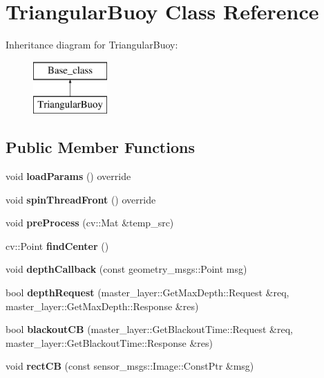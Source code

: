 \hypertarget{classTriangularBuoy}{}\section{Triangular\+Buoy Class Reference}
\label{classTriangularBuoy}
Inheritance diagram for Triangular\+Buoy\+:\begin{figure}[H]
\begin{center}
\leavevmode
\includegraphics[height=2.000000cm]{classTriangularBuoy}
\end{center}
\end{figure}
\subsection*{Public Member Functions}
\begin{DoxyCompactItemize}
\item 
\mbox{\label{classTriangularBuoy_a828edf15be63e5aa4268963eb9f80c2e}} 
void {\bfseries load\+Params} () override
\item 
\mbox{\label{classTriangularBuoy_a68fcbd32c061db9674e7dd8e3e21052c}} 
void {\bfseries spin\+Thread\+Front} () override
\item 
\mbox{\label{classTriangularBuoy_af6afe6c2e359ab2d211826144325095a}} 
void {\bfseries pre\+Process} (cv\+::\+Mat \&temp\+\_\+src)
\item 
\mbox{\label{classTriangularBuoy_a58ce109b094f08f2d5dadc0e6e8071a1}} 
cv\+::\+Point {\bfseries find\+Center} ()
\item 
\mbox{\label{classTriangularBuoy_a6679005a7fa78c4e76bebc5f78b8cb90}} 
void {\bfseries depth\+Callback} (const geometry\+\_\+msgs\+::\+Point msg)
\item 
\mbox{\label{classTriangularBuoy_ab73d1e3ef0a1c9d217cc7ebef20b966f}} 
bool {\bfseries depth\+Request} (master\+\_\+layer\+::\+Get\+Max\+Depth\+::\+Request \&req, master\+\_\+layer\+::\+Get\+Max\+Depth\+::\+Response \&res)
\item 
\mbox{\label{classTriangularBuoy_abfa97d165629a27ed4af44553b53aceb}} 
bool {\bfseries blackout\+CB} (master\+\_\+layer\+::\+Get\+Blackout\+Time\+::\+Request \&req, master\+\_\+layer\+::\+Get\+Blackout\+Time\+::\+Response \&res)
\item 
\mbox{\label{classTriangularBuoy_aba45313f809b8bd27b2ad46dfbd35cb7}} 
void {\bfseries rect\+CB} (const sensor\+\_\+msgs\+::\+Image\+::\+Const\+Ptr \&msg)
\end{DoxyCompactItemize}
